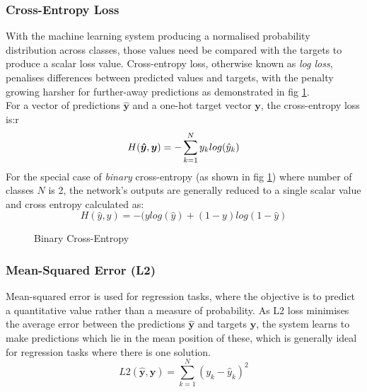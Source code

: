 \documentclass{report}
\begin{document}
\subsubsection{Cross-Entropy Loss}
With the machine learning system producing a normalised probability distribution across classes, those values need be compared with the targets to produce a scalar loss value.
Cross-entropy loss, otherwise known as \textit{log loss}, penalises differences between predicted values and targets, with the penalty growing harsher for further-away predictions as demonstrated in fig \ref{fig:cross-entropy:1}.\\
For a vector of predictions $\bm{\hat{y}}$ and a one-hot target vector $\bm{y}$, the cross-entropy loss is:r
\begin{equation} \label{cross-entropy:1}
 H(\bm{\hat{y}}, \bm{y}) = - \sum_{k=1}^{N}y_k log(\hat{y}_k) \\
\end{equation}
For the special case of \textit{binary} cross-entropy (as shown in fig \ref{fig:cross-entropy:1}) where number of classes $N$ is 2, the network's outputs are generally reduced to a single scalar value and cross entropy calculated as:
\begin{equation} \label{cross-entropy:2}
 H(\hat{y}, y) = -(y log(\hat{y}) + (1 - y)log(1-\hat{y})
\end{equation}
\begin{figure}[!h]
 \centering
 \caption{Binary Cross-Entropy}
 \label{fig:cross-entropy:1}
\end{figure}

\subsubsection{Mean-Squared Error (L2)}
Mean-squared error is used for regression tasks, where the objective is to predict a quantitative value rather than a measure of probability. As L2 loss minimises the average error between the predictions $\bm{\hat{y}}$ and targets $\bm{y}$, the system learns to make predictions which lie in the mean position of these, which is generally ideal for regression tasks where there is one solution.\\
\begin{equation} \label{mean-squared-error:1}
 L2(\hat{\bm{y}}, \bm{y}) = \sum_{k=1}^{N}(y_k - \hat{y}_k)^2
\end{equation}
\end{document}
